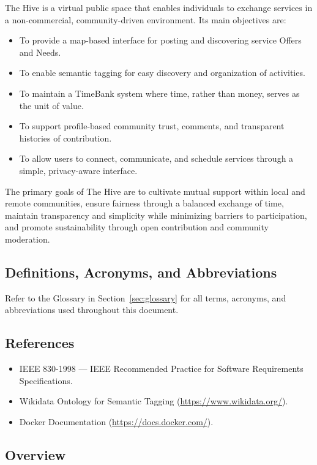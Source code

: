 \documentclass[11pt,a4paper]{report}
\begin{document}
The Hive is a virtual public space that enables individuals to exchange services in a non-commercial, community-driven environment. Its main objectives are:
\begin{itemize}
    \item To provide a map-based interface for posting and discovering service Offers and Needs.
    \item To enable semantic tagging for easy discovery and organization of activities.
    \item To maintain a TimeBank system where time, rather than money, serves as the unit of value.
    \item To support profile-based community trust, comments, and transparent histories of contribution.
    \item To allow users to connect, communicate, and schedule services through a simple, privacy-aware interface.
\end{itemize}

The primary goals of The Hive are to cultivate mutual support within local and remote communities, ensure fairness through a balanced exchange of time, maintain transparency and simplicity while minimizing barriers to participation, and promote sustainability through open contribution and community moderation.

\subsection{Definitions, Acronyms, and Abbreviations}

Refer to the Glossary in Section~\ref{sec:glossary} for all terms, acronyms, and abbreviations used throughout this document.

\subsection{References}

\begin{itemize}
    \item IEEE 830-1998 --- IEEE Recommended Practice for Software Requirements Specifications.
    \item Wikidata Ontology for Semantic Tagging (\url{https://www.wikidata.org/}).
    \item Docker Documentation (\url{https://docs.docker.com/}).
\end{itemize}

\subsection{Overview}
\end{document}
